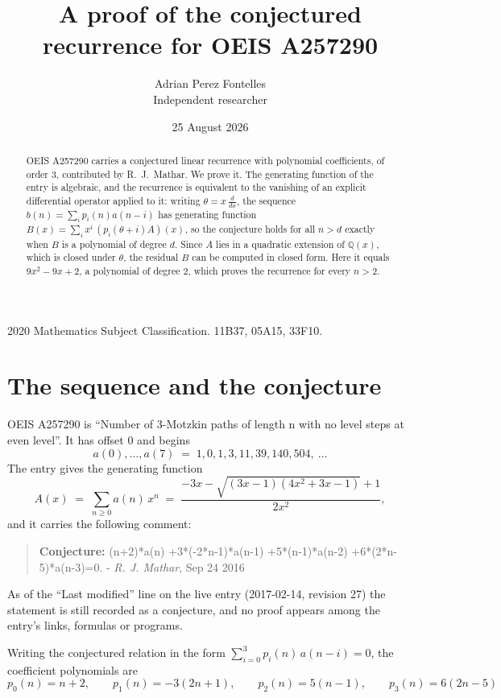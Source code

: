 \documentclass[11pt,a4paper]{article}
\title{A proof of the conjectured recurrence for OEIS A257290}
\author{Adrian Perez Fontelles\\ \small Independent researcher}
\date{25 August 2026}
\theoremstyle{plain}
\theoremstyle{definition}
\begin{document}
\maketitle

\begin{abstract}
OEIS A257290 carries a conjectured linear recurrence with polynomial coefficients, of
order 3, contributed by R.~J.~Mathar. We prove it. The generating function of the
entry is algebraic, and the recurrence is equivalent to the vanishing of an explicit
differential operator applied to it: writing $\theta=x\,\frac{d}{dx}$, the sequence
$b(n)=\sum_{i}p_{i}(n)a(n-i)$ has generating function
$B(x)=\sum_{i}x^{i}\,(p_{i}(\theta+i)A)(x)$, so the conjecture holds for all $n>d$ exactly
when $B$ is a polynomial of degree $d$. Since $A$ lies in a quadratic extension of
$\mathbb{Q}(x)$, which is closed under $\theta$, the residual $B$ can be computed in
closed form. Here it equals $9 x^{2} - 9 x + 2$, a polynomial of degree $2$, which proves
the recurrence for every $n>2$.
\end{abstract}

\noindent\small 2020 Mathematics Subject Classification. 11B37, 05A15, 33F10.\normalsize

\section{The sequence and the conjecture}

OEIS A257290 is ``Number of 3-Motzkin paths of length n with no level steps at even level''. It has offset $0$ and begins
\[
a(0),\dots,a(7)\;=\;1, 0, 1, 3, 11, 39, 140, 504,\ \dots
\]
The entry gives the generating function
\begin{equation}\label{eq:gf}
A(x)\;=\;\sum_{n\ge 0} a(n)\,x^{n}\;=\;\frac{- 3 x - \sqrt{\left(3 x - 1\right) \left(4 x^{2} + 3 x - 1\right)} + 1}{2 x^{2}} ,
\end{equation}
and it carries the following comment:
\begin{quote}\small
\textbf{Conjecture:} (n+2)*a(n) +3*(-2*n-1)*a(n-1) +5*(n-1)*a(n-2) +6*(2*n-5)*a(n-3)=0. - \emph{R. J. Mathar}, Sep 24 2016
\end{quote}
As of the ``Last modified'' line on the live entry (2017-02-14, revision 27) the
statement is still recorded as a conjecture, and no proof appears among the entry's links,
formulas or programs.

Writing the conjectured relation in the form $\sum_{i=0}^{3}p_{i}(n)\,a(n-i)=0$,
the coefficient polynomials are
\[
p_{0}(n)=n + 2,\qquad p_{1}(n)=- 3 \left(2 n + 1\right),\qquad p_{2}(n)=5 \left(n - 1\right),\qquad p_{3}(n)=6 \left(2 n - 5\right)
\]
\end{document}
